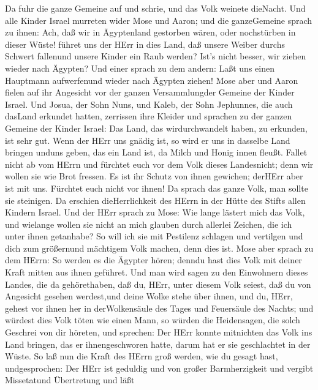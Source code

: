 Da fuhr die ganze Gemeine auf und schrie, und das Volk
weinete dieNacht.  Und alle Kinder Israel murreten wider
Mose und Aaron; und die ganzeGemeine sprach zu ihnen: Ach, daß wir in
Ägyptenland gestorben wären, oder nochstürben in dieser Wüste!
 führet uns der HErr in dies Land, daß unsere Weiber durchs
Schwert fallenund unsere Kinder ein Raub werden? Ist's nicht besser, wir
ziehen wieder nach Ägypten?  Und einer sprach zu dem andern:
Laßt uns einen Hauptmann aufwerfenund wieder nach Ägypten ziehen!
 Mose aber und Aaron fielen auf ihr Angesicht vor der ganzen
Versammlungder Gemeine der Kinder Israel.  Und Josua, der
Sohn Nuns, und Kaleb, der Sohn Jephunnes, die auch dasLand erkundet
hatten, zerrissen ihre Kleider  und sprachen zu der ganzen
Gemeine der Kinder Israel: Das Land, das wirdurchwandelt haben, zu
erkunden, ist sehr gut.  Wenn der HErr uns gnädig ist, so
wird er uns in dasselbe Land bringen unduns geben, das ein Land ist, da
Milch und Honig innen fleußt.  Fallet nicht ab vom HErrn und
fürchtet euch vor dem Volk dieses Landesnicht; denn wir wollen sie wie
Brot fressen. Es ist ihr Schutz von ihnen gewichen; derHErr aber ist mit
uns. Fürchtet euch nicht vor ihnen!  Da sprach das ganze
Volk, man sollte sie steinigen. Da erschien dieHerrlichkeit des HErrn in
der Hütte des Stifts allen Kindern Israel.  Und der HErr
sprach zu Mose: Wie lange lästert mich das Volk, und wielange wollen sie
nicht an mich glauben durch allerlei Zeichen, die ich unter ihnen
getanhabe?  So will ich sie mit Pestilenz schlagen und
vertilgen und dich zum größernund mächtigem Volk machen, denn dies ist.
 Mose aber sprach zu dem HErrn: So werden es die Ägypter
hören; denndu hast dies Volk mit deiner Kraft mitten aus ihnen geführet.
 Und man wird sagen zu den Einwohnern dieses Landes, die da
gehörethaben, daß du, HErr, unter diesem Volk seiest, daß du von
Angesicht gesehen werdest,und deine Wolke stehe über ihnen, und du,
HErr, gehest vor ihnen her in derWolkensäule des Tages und Feuersäule
des Nachts;  und würdest dies Volk töten wie einen Mann, so
würden die Heidensagen, die solch Geschrei von dir höreten, und
sprechen:  Der HErr konnte mitnichten das Volk ins Land
bringen, das er ihnengeschworen hatte, darum hat er sie geschlachtet in
der Wüste.  So laß nun die Kraft des HErrn groß werden, wie
du gesagt hast, undgesprochen:  Der HErr ist geduldig und
von großer Barmherzigkeit und vergibt Missetatund Übertretung und läßt
